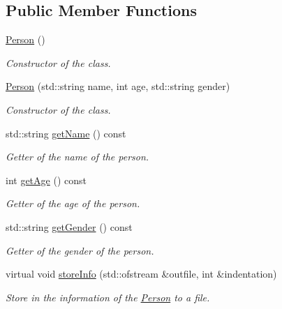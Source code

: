 \subsection*{Public Member Functions}
\begin{DoxyCompactItemize}
\item 
\mbox{\label{class_person_a0397c6f89fafc12e738923f612bc41a3}} 
\mbox{\hyperlink{class_person_a0397c6f89fafc12e738923f612bc41a3}{Person}} ()
\begin{DoxyCompactList}\small\item\em Constructor of the class. \end{DoxyCompactList}\item 
\mbox{\hyperlink{class_person_a19ba5bb7e92c776268b3d453b4ef55b2}{Person}} (std\+::string name, int age, std\+::string gender)
\begin{DoxyCompactList}\small\item\em Constructor of the class. \end{DoxyCompactList}\item 
std\+::string \mbox{\hyperlink{class_person_a9db2e2ccfc6cfa0d7979613ec2aaa922}{get\+Name}} () const
\begin{DoxyCompactList}\small\item\em Getter of the name of the person. \end{DoxyCompactList}\item 
int \mbox{\hyperlink{class_person_a4b66dbee570398920b8fb6aacddd2559}{get\+Age}} () const
\begin{DoxyCompactList}\small\item\em Getter of the age of the person. \end{DoxyCompactList}\item 
std\+::string \mbox{\hyperlink{class_person_a3abba7ffeabffb247ec36230df68cec4}{get\+Gender}} () const
\begin{DoxyCompactList}\small\item\em Getter of the gender of the person. \end{DoxyCompactList}\item 
virtual void \mbox{\hyperlink{class_person_a80f87df3f644706c2ad8fc8b800fdd95}{store\+Info}} (std\+::ofstream \&outfile, int \&indentation)
\begin{DoxyCompactList}\small\item\em Store in the information of the \mbox{\hyperlink{class_person}{Person}} to a file. \end{DoxyCompactList}\item 

\end{DoxyCompactItemize}
